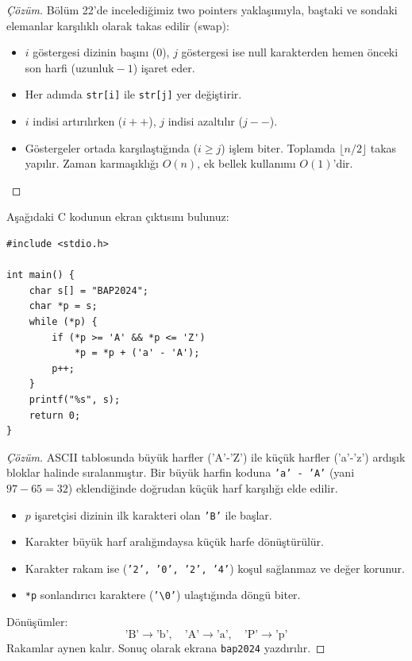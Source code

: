 \begin{proof}[Çözüm]
Bölüm 22'de incelediğimiz two pointers yaklaşımıyla, baştaki ve sondaki elemanlar karşılıklı olarak takas edilir (swap):
\begin{itemize}
    \item $i$ göstergesi dizinin başını ($0$), $j$ göstergesi ise null karakterden hemen önceki son harfi ($\text{uzunluk} - 1$) işaret eder.
    \item Her adımda \texttt{str[i]} ile \texttt{str[j]} yer değiştirir.
    \item $i$ indisi artırılırken ($i++$), $j$ indisi azaltılır ($j--$).
    \item Göstergeler ortada karşılaştığında ($i \ge j$) işlem biter. Toplamda $\lfloor n/2 \rfloor$ takas yapılır. Zaman karmaşıklığı $O(n)$, ek bellek kullanımı $O(1)$'dir.
\end{itemize}
\end{proof}

\begin{example}
Aşağıdaki C kodunun ekran çıktısını bulunuz:
\begin{lstlisting}[language=CTemel]
#include <stdio.h>

int main() {
    char s[] = "BAP2024";
    char *p = s;
    while (*p) {
        if (*p >= 'A' && *p <= 'Z')
            *p = *p + ('a' - 'A');
        p++;
    }
    printf("%s", s);
    return 0;
}
\end{lstlisting}
\end{example}

\begin{proof}[Çözüm]
ASCII tablosunda büyük harfler ('A'-'Z') ile küçük harfler ('a'-'z') ardışık bloklar halinde sıralanmıştır. Bir büyük harfin koduna \texttt{'a' - 'A'} (yani $97 - 65 = 32$) eklendiğinde doğrudan küçük harf karşılığı elde edilir.
\begin{itemize}
    \item $p$ işaretçisi dizinin ilk karakteri olan \texttt{'B'} ile başlar.
    \item Karakter büyük harf aralığındaysa küçük harfe dönüştürülür.
    \item Karakter rakam ise (\texttt{'2', '0', '2', '4'}) koşul sağlanmaz ve değer korunur.
    \item \texttt{*p} sonlandırıcı karaktere (\texttt{'\textbackslash 0'}) ulaştığında döngü biter.
\end{itemize}
Dönüşümler:
\[
\text{'B'} \to \text{'b'}, \quad \text{'A'} \to \text{'a'}, \quad \text{'P'} \to \text{'p'}
\]
Rakamlar aynen kalır. Sonuç olarak ekrana \texttt{bap2024} yazdırılır.
\end{proof}

